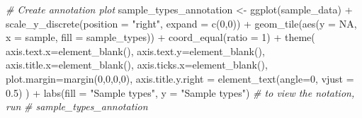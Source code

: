 \documentclass[
]{book}
\newenvironment{Shaded}{\begin{snugshade}}{\end{snugshade}}
\newcommand{\AttributeTok}[1]{\textcolor[rgb]{0.77,0.63,0.00}{#1}}
\newcommand{\CommentTok}[1]{\textcolor[rgb]{0.56,0.35,0.01}{\textit{#1}}}
\newcommand{\ConstantTok}[1]{\textcolor[rgb]{0.00,0.00,0.00}{#1}}
\newcommand{\DecValTok}[1]{\textcolor[rgb]{0.00,0.00,0.81}{#1}}
\newcommand{\FloatTok}[1]{\textcolor[rgb]{0.00,0.00,0.81}{#1}}
\newcommand{\FunctionTok}[1]{\textcolor[rgb]{0.00,0.00,0.00}{#1}}
\newcommand{\NormalTok}[1]{#1}
\newcommand{\OtherTok}[1]{\textcolor[rgb]{0.56,0.35,0.01}{#1}}
\newcommand{\SpecialCharTok}[1]{\textcolor[rgb]{0.00,0.00,0.00}{#1}}
\newcommand{\StringTok}[1]{\textcolor[rgb]{0.31,0.60,0.02}{#1}}
\begin{document}
\begin{Shaded}
\begin{Highlighting}[]
\CommentTok{\# Create annotation plot}
\NormalTok{sample\_types\_annotation }\OtherTok{\textless{}{-}} \FunctionTok{ggplot}\NormalTok{(sample\_data) }\SpecialCharTok{+}
  \FunctionTok{scale\_y\_discrete}\NormalTok{(}\AttributeTok{position =} \StringTok{"right"}\NormalTok{, }\AttributeTok{expand =} \FunctionTok{c}\NormalTok{(}\DecValTok{0}\NormalTok{,}\DecValTok{0}\NormalTok{)) }\SpecialCharTok{+}
  \FunctionTok{geom\_tile}\NormalTok{(}\FunctionTok{aes}\NormalTok{(}\AttributeTok{y =} \ConstantTok{NA}\NormalTok{, }\AttributeTok{x =}\NormalTok{ sample, }\AttributeTok{fill =}\NormalTok{ sample\_types)) }\SpecialCharTok{+}
  \FunctionTok{coord\_equal}\NormalTok{(}\AttributeTok{ratio =} \DecValTok{1}\NormalTok{) }\SpecialCharTok{+}
  \FunctionTok{theme}\NormalTok{(}
        \AttributeTok{axis.text.x=}\FunctionTok{element\_blank}\NormalTok{(),}
        \AttributeTok{axis.text.y=}\FunctionTok{element\_blank}\NormalTok{(),}
        \AttributeTok{axis.title.x=}\FunctionTok{element\_blank}\NormalTok{(),}
        \AttributeTok{axis.ticks.x=}\FunctionTok{element\_blank}\NormalTok{(),}
        \AttributeTok{plot.margin=}\FunctionTok{margin}\NormalTok{(}\DecValTok{0}\NormalTok{,}\DecValTok{0}\NormalTok{,}\DecValTok{0}\NormalTok{,}\DecValTok{0}\NormalTok{),}
        \AttributeTok{axis.title.y.right =} \FunctionTok{element\_text}\NormalTok{(}\AttributeTok{angle=}\DecValTok{0}\NormalTok{, }\AttributeTok{vjust =} \FloatTok{0.5}\NormalTok{)}
\NormalTok{        ) }\SpecialCharTok{+}
      \FunctionTok{labs}\NormalTok{(}\AttributeTok{fill =} \StringTok{"Sample types"}\NormalTok{, }\AttributeTok{y =} \StringTok{"Sample types"}\NormalTok{)}
\CommentTok{\# to view the notation, run}
\CommentTok{\# sample\_types\_annotation}


\end{Highlighting}
\end{Shaded}
\end{document}
